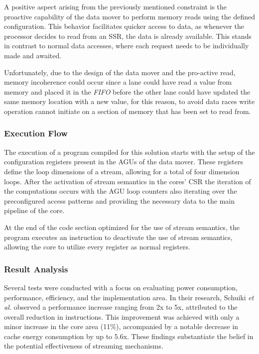 A positive aspect arising from the previously mentioned constraint is the proactive capability of the data mover to perform memory reads using the defined configuration. This behavior facilitates quicker access to data, as whenever the processor decides to read from an SSR, the data is already available. This stands in contrast to normal data accesses, where each request needs to be individually made and awaited.

Unfortunately, due to the design of the data mover and the pro-active read, memory incoherence could occur since a lane could have read a value from memory and placed it in the \textit{FIFO} before the other lane could have updated the same memory location with a new value, for this reason, to avoid data races write operation cannot initiate on a section of memory that has been set to read from.

\subsubsection{Execution Flow}

The execution of a program compiled for this solution starts with the setup of the configuration registers present in the AGUs of the data mover. These registers define the loop dimensions of a stream, allowing for a total of four dimension loops. After the activation of stream semantics in the cores' CSR the iteration of the computations occurs with the AGU loop counters also iterating over the preconfigured access patterns and providing the necessary data to the main pipeline of the core.

At the end of the code section optimized for the use of stream semantics, the program executes an instruction to deactivate the use of stream semantics, allowing the core to utilize every register as normal registers.

\subsubsection{Result Analysis}


Several tests were conducted with a focus on evaluating power consumption, performance, efficiency, and the implementation area. In their research, Schuiki \textit{et al.} \cite{9068465} observed a performance increase ranging from 2x to 5x, attributed to the overall reduction in instructions. This improvement was achieved with only a minor increase in the core area (11\%), accompanied by a notable decrease in cache energy consumption by up to 5.6x. These findings substantiate the belief in the potential effectiveness of streaming mechanisms.

